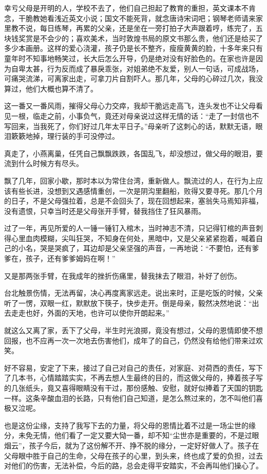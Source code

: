 \par 幸亏父母是开明的人，学校不去了，他们自己担起了教育的重担，英文课本不肯念，干脆教她看浅近英文小说；国文不能死背，就念唐诗宋词吧；钢琴老师请来家里教不说，每日练琴，再累的父亲，还是坐在一旁打拍子大声跟着哼，练完了，五块钱奖赏是不会少的；喜欢美术，当时敦煌书局的原文书那么贵，他们还是给买了多少本画册。这样的爱心浇灌，孩子仍是长不整齐，瘦瘦黄黄的脸，十多年来只有童年时不知事地畅笑过，长大后怎么开导，仍是绝对没有好脸色的。在家也许是因为自卑太甚，行为反而成了暴戾乖张，对姐弟绝不友爱，别人一句话，可成战场，可痛哭流涕，可离家出走，可拿刀片自割吓人。那几年，父母的心碎过几次，我没算过，他们大概也算不清了。
\par 这一番又一番风雨，摧得父母心力交瘁，我却干脆远走高飞，连头发也不让父母看见一根，临走之前，小事负气，竟还对母亲说过这样无情的话：“走了一封信也不写回来，当我死了，你们好过几年太平日子。”母亲听了这刺心的话，默默无语，眼泪簌簌地掉，理行装的手可没停过。
\par 真走了，小燕离巢，任凭自己飘飘跌跌，各国乱飞，却没想过，做父母的眼泪，要流到什么时候方有尽头。
\par 飘了几年，回家小歇，那时本以为常住台湾，重新做人。飘流过的人，在行为上应该有些长进，没想到又遇感情重创，一次是阴沟里翻船，败得又要寻死。那几个月的日子，不是父母强拉着，总是不会回头了，现在回想起来，塞翁失马焉知非福，没有遗恨，只幸当时还是父母张开手臂，替我挡住了狂风暴雨。
\par 过了一年，再见所爱的人一锤一锤钉入棺木，当时神志不清，只记得钉棺的声音刺得心里血肉模糊，尖叫狂哭，不知身在何处，黑暗中，又是父亲紧紧抱着，喊着自己的小名，哭是哭疯了，耳边却是父亲坚强的声音，一再地说：“不要怕，还有爹爹在，孩子，还有爹爹姆妈在啊！”
\par 又是那两张手臂，在我成年的挫折伤痛里，替我抹去了眼泪，补好了创伤。
\par 台北触景伤情，无法再留，决心再度离家远走。说出来时，正是吃饭的时候，父亲听了一愣，双眼一红，默默放下筷子，快步走开。倒是母亲，毅然决然地说：“出去走走也好，外面的天地，也许可以使你开朗起来。”
\par 就这么又离了家，丢下了父母，半生时光浪掷，竟没有想过，父母的恩情即使不想回报，也不应再一次一次地去伤害他们，成年了的自己，仍然没有给他们带来过欢笑。
\par 好不容易，安定了下来，接过了自己对自己的责任，对家庭、对荷西的责任，写下了几本书，心情踏踏实实，不再去想人生最终的目的，而这做父母的，捧着孩子写的几张纸头，竟又喜得眼睛没有干过，那份感触、安慰，就好似捧着了天国的钥匙一样。这条辛酸血泪的长路，只有他们自己知道，是怎么熬过来的，怎不叫他们喜极又泣呢。
\par 也是这份尘缘，支持了我写下去的力量，将父母的恩情比着不过是一场尘世的缘分，未免无情，他们看了一定又要大恸一番，却不知“尘世亦是重要的，不是过眼烟云”，孩子今后，就为了这份解不开、挣不脱的缘分，一定好好做人了。孩子在父母眼中胜于自己的生命，父母在孩子的心里，到头来，终也成了爱的负担，过去对他们的伤害，无法补偿，今后的路，总会走得平安踏实，不会再叫他们操心了。
